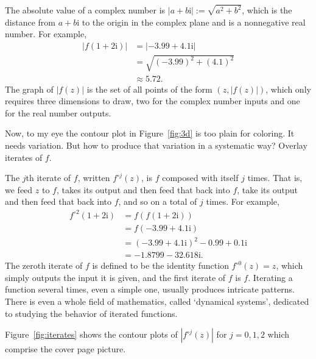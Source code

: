 \documentclass[12pt, a4paper]{amsart}
\newcommand{\mi}{\text{i}}  %
\begin{document}
The absolute value of a complex number is $|a + b\mi| := \sqrt{a^2 + b^2}$, which is the distance from $a + b\mi$ to the origin in the complex plane and is a nonnegative real number. 
For example, 
\begin{align*}
    |f(1 + 2\mi)| 
    &= 
    |-3.99 + 4.1\mi| \\
    &=
    \sqrt{(-3.99)^2 + (4.1)^2} \\
    &\approx 
    5.72.
\end{align*}
The graph of $|f(z)|$ is the set of all points of the form $(z, |f(z)|)$, which only requires three dimensions to draw, two for the complex number inputs and one for the real number outputs.

Now, to my eye the contour plot in Figure~\ref{fig:3d} is too plain for coloring.
It needs variation.
But how to produce that variation in a systematic way?
Overlay iterates of $f$. 

The $j$th iterate of $f$, written $f^{\circ j}(z)$, is $f$ composed with itself $j$ times.
That is, we feed $z$ to $f$, takes its output and then feed that back into $f$, take its output and then feed that back into $f$, and so on a total of $j$ times.
For example,
\begin{align*}
    f^{\circ 2}(1 + 2\mi)
    &=
    f(f(1 + 2\mi)) \\
    &= 
    f(-3.99 + 4.1\mi) \\
    &= 
    (-3.99 + 4.1\mi)^2 - 0.99 + 0.1\mi \\
    &= 
    -1.8799 - 32.618\mi.
\end{align*}
The zeroth iterate of $f$ is defined to be the identity function $f^{\circ 0}(z) = z$, which simply outputs the input it is given, and the first iterate of $f$ is $f$.
Iterating a function several times, even a simple one, usually produces intricate patterns.
There is even a whole field of mathematics, called `dynamical systems', dedicated to studying the behavior of iterated functions.

Figure~\ref{fig:iterates} shows the contour plots of $|f^{\circ j}(z)|$ for $j = 0, 1, 2$ which comprise the cover page picture.
\end{document}

